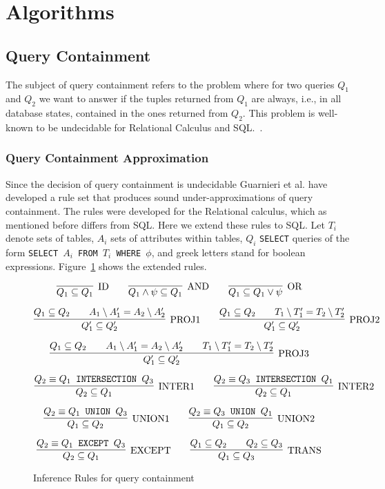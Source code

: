 \section{Algorithms}

\subsection{Query Containment}

The subject of query containment refers to the problem where for two queries $Q_1$ and $Q_2$ we want to answer if the tuples returned from $Q_1$ are always, i.e., in all database states, contained in the ones returned from $Q_2$.
%
This problem is well-known to be undecidable for Relational Calculus and SQL.~\cite{abiteboul1995foundations}.
%

\subsubsection{Query Containment Approximation}

Since the decision of query containment is undecidable Guarnieri et al. have developed a rule set that produces sound under-approximations of query containment.
%
The rules were developed for the Relational calculus, which as mentioned before differs from SQL. 
%
Here we extend these rules to SQL.
%
Let $T_i$ denote sets of tables, $A_i$ sets of attributes within tables, $Q_i$ \texttt{SELECT} queries of the form \texttt{SELECT $A_i$ FROM $T_i$ WHERE $\phi$}, and greek letters stand for boolean expressions.
%
Figure~\ref{figure:algorithms:infrules} shows the extended rules.

\begin{figure}[!ht]
\[
\infer[\text{ID}]
	{Q_1 \subseteq Q_1}
	{}
\qquad	
\infer[\text{AND}]
	{Q_1 \land \psi \subseteq Q_1}
	{}
\qquad
\infer[\text{OR}]
	{Q_1 \subseteq Q_1 \lor \psi}
	{}
\]

\[
\infer[\text{PROJ1}]
	{Q_1' \subseteq Q_2'}
	{Q_1 \subseteq Q_2 \qquad A_1 \setminus A_1' = A_2 \setminus A_2'}
\qquad
\infer[\text{PROJ2}]
	{Q_1' \subseteq Q_2'}
	{Q_1 \subseteq Q_2 \qquad T_1 \setminus T_1' = T_2 \setminus T_2'}
\]

\[
\infer[\text{PROJ3}]
	{Q_1' \subseteq Q_2'}
	{Q_1 \subseteq Q_2 \qquad A_1 \setminus A_1' = A_2 \setminus A_2' \qquad T_1 \setminus T_1' = T_2 \setminus T_2'}
\]

\[
\infer[\text{INTER1}]
	{Q_2 \subseteq Q_1}
	{Q_2 \equiv Q_1 \text{\texttt{ INTERSECTION }} Q_3}
\qquad
\infer[\text{INTER2}]
	{Q_2 \subseteq Q_1}
	{Q_2 \equiv Q_3 \text{\texttt{ INTERSECTION }} Q_1}
\]

\[
\infer[\text{UNION1}]
	{Q_1 \subseteq Q_2}
	{Q_2 \equiv Q_1 \text{\texttt{ UNION }} Q_3}
\qquad
\infer[\text{UNION2}]
	{Q_1 \subseteq Q_2}
	{Q_2 \equiv Q_3 \text{\texttt{ UNION }} Q_1}
\]

\[
\infer[\text{EXCEPT}]
	{Q_2 \subseteq Q_1}
	{Q_2 \equiv Q_1 \text{\texttt{ EXCEPT }} Q_3}
\qquad
\infer[\text{TRANS}]
	{Q_1 \subseteq Q_3}
	{Q_1 \subseteq Q_2 \qquad Q_2 \subseteq Q_3}
\]
\caption{Inference Rules for query containment}
\label{figure:algorithms:infrules}
\end{figure}

